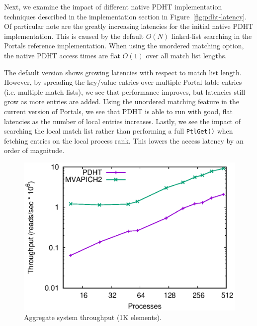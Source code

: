Next, we examine the impact of different native PDHT implementation techniques
described in the implementation section in Figure~\ref{fig:pdht-latency}.  
Of particular note are the greatly increasing latencies for the initial native
PDHT implementation. This is caused by the default $O(N)$ linked-list searching
in the Portals reference implementation. When using the unordered matching
option, the native PDHT access times are flat $O(1)$ over all match list
lengths.

The default version shows growing latencies with respect to match list length.
However, by spreading the key/value entries over multiple Portal table entries (i.e.
multiple match lists), we see that performance improves, but latencies still
grow as more entries are added. Using the unordered matching feature in the
current version of Portals, we see that PDHT is able to run with good, flat
latencies as the number of local entries increases. Lastly, we see the impact
of searching the local match list rather than performing a full {\tt PtlGet()}
when fetching entries on the local process rank. This lowers the access latency
by an order of magnitude.

\begin{figure}
    \centering
    \includegraphics[width=.9\linewidth]{plots/scaling1k}
    \caption{Aggregate system throughput (1K elements).}
    \label{fig:throughput-small}
\end{figure}

